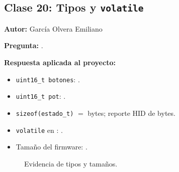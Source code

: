 \subsection{Clase 20: Tipos y \texttt{volatile}}
\textbf{Autor:} García Olvera Emiliano

\textbf{Pregunta:} .

\textbf{Respuesta aplicada al proyecto:}
\begin{itemize}
	\item \texttt{uint16\_t botones}: .
	\item \texttt{uint16\_t pot}: .
	\item \texttt{sizeof(estado\_t)} $=$  bytes; reporte HID de  bytes.
	\item \texttt{volatile} en : .
	\item Tamaño del firmware: .
\end{itemize}

\begin{figure}[H]
	\centering
	\caption{Evidencia de tipos y tamaños.}
	\label{fig:tipos}
\end{figure}
